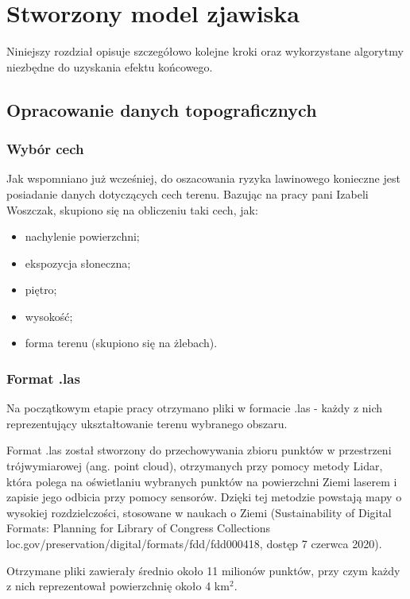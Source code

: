 \chapter{Stworzony model zjawiska}

Niniejszy rozdział opisuje szczegółowo kolejne kroki oraz wykorzystane algorytmy niezbędne do uzyskania efektu końcowego.


\section{Opracowanie danych topograficznych}

\subsection{Wybór cech}
Jak wspomniano już wcześniej, do oszacowania ryzyka lawinowego konieczne jest posiadanie danych dotyczących cech terenu. Bazując na pracy pani Izabeli Woszczak, skupiono się na obliczeniu taki cech, jak:
\begin{itemize}
	\item nachylenie powierzchni;
	\item ekspozycja słoneczna;
	\item piętro;
	\item wysokość;
	\item forma terenu (skupiono się na żlebach).
\end{itemize}

\subsection{Format .las}
Na początkowym etapie pracy otrzymano pliki w formacie .las - każdy z nich reprezentujący ukształtowanie terenu wybranego obszaru. 

Format .las został stworzony do przechowywania zbioru punktów w przestrzeni trójwymiarowej (ang. point cloud), otrzymanych przy pomocy metody Lidar, która polega na oświetlaniu wybranych punktów na powierzchni Ziemi laserem i zapisie jego odbicia przy pomocy sensorów. Dzięki tej metodzie powstają mapy o wysokiej rozdzielczości, stosowane w naukach o Ziemi (Sustainability of Digital Formats: Planning for Library of Congress Collections loc.gov/preservation/digital/formats/fdd/fdd000418, dostęp 7 czerwca 2020). 

Otrzymane pliki zawierały średnio około 11 milionów punktów, przy czym każdy z nich reprezentował powierzchnię około 4 km$^2$.

